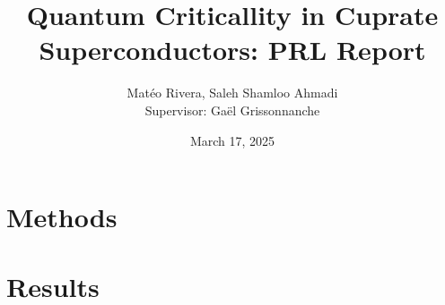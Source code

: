 \documentclass[12pt]{article}
\title{Quantum Criticallity in Cuprate Superconductors: PRL Report}
\author{Matéo Rivera, Saleh Shamloo Ahmadi\\Supervisor: Gaël Grissonnanche}
\date{March 17, 2025}
\begin{document}
\maketitle







\section{Methods}




\section{Results}








\end{document}
